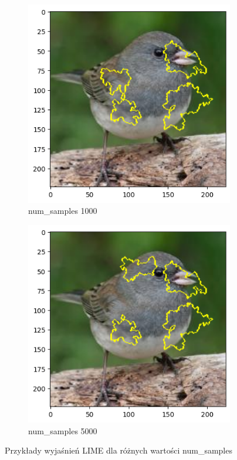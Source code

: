 \begin{figure}
\begin{subfigure}[b]{0.3\textwidth}
		\centering\includegraphics[width=.9\textwidth]{img/parameters/lime/num_samples_1000}
		\caption{num\_samples 1000}  \label{rys:parameters_lime_numsamples_1000}
	\end{subfigure}
	\begin{subfigure}[b]{0.3\textwidth}
		\centering\includegraphics[width=.9\textwidth]{img/parameters/lime/num_samples_5000}
		\caption{num\_samples 5000}  \label{rys:parameters_lime_numsamples_5000}
	\end{subfigure}
	\caption{Przykłady wyjaśnień LIME dla różnych wartości num\_samples}
\end{figure}


